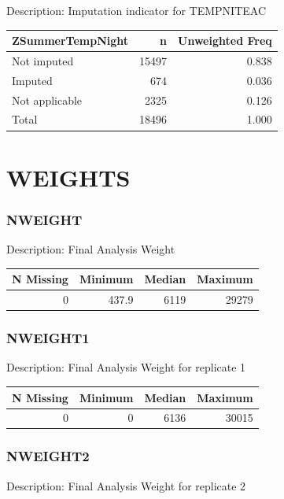 \documentclass[
]{krantz}
\begin{document}
Description: Imputation indicator for TEMPNITEAC

\begin{tabular}[t]{l|r|r}
\hline
ZSummerTempNight & n & Unweighted Freq\\
\hline
Not imputed & 15497 & 0.838\\
\hline
Imputed & 674 & 0.036\\
\hline
Not applicable & 2325 & 0.126\\
\hline
Total & 18496 & 1.000\\
\hline
\end{tabular}

\hypertarget{weights-1}{%
\section{WEIGHTS}\label{weights-1}}

\hypertarget{nweight}{%
\subsubsection*{NWEIGHT}\label{nweight}}


Description: Final Analysis Weight

\begin{tabular}[t]{r|r|r|r}
\hline
N Missing & Minimum & Median & Maximum\\
\hline
0 & 437.9 & 6119 & 29279\\
\hline
\end{tabular}

\hypertarget{nweight1}{%
\subsubsection*{NWEIGHT1}\label{nweight1}}


Description: Final Analysis Weight for replicate 1

\begin{tabular}[t]{r|r|r|r}
\hline
N Missing & Minimum & Median & Maximum\\
\hline
0 & 0 & 6136 & 30015\\
\hline
\end{tabular}

\hypertarget{nweight2}{%
\subsubsection*{NWEIGHT2}\label{nweight2}}


Description: Final Analysis Weight for replicate 2
\end{document}
